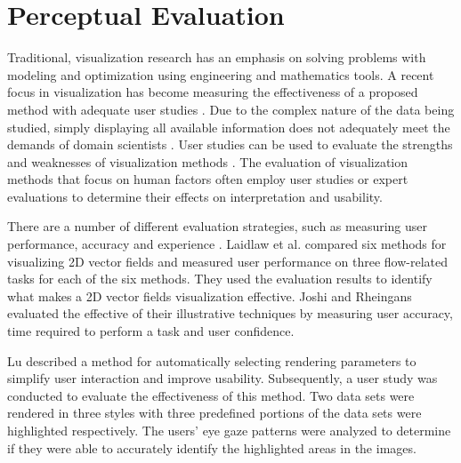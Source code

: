 


\section{Perceptual Evaluation}
Traditional, visualization research has an emphasis on solving problems with modeling and optimization using engineering and mathematics tools.
A recent focus in visualization has become measuring the effectiveness of a proposed method with adequate user studies \cite{giesen_conjoint_2007}.
Due to the complex nature of the data being studied, simply displaying all available information does not adequately meet the demands of domain scientists \cite{anderson_evaluating_2012}.
User studies can be used to evaluate the strengths and weaknesses of visualization methods \cite{christopher_thoughts_2003}.
The evaluation of visualization methods that focus on human factors often employ user studies or expert evaluations to determine their effects on interpretation and usability.

There are a number of different evaluation strategies, such as measuring user performance, accuracy and experience \cite{redmond_influencing_2010}. Laidlaw et al. \cite{laidlaw_quantitative_2001} compared six methods for visualizing 2D vector fields and measured user performance on three flow-related tasks for each of the six methods. They used the evaluation results to identify what makes a 2D vector fields visualization effective.
Joshi and Rheingans \cite{joshi_evaluation_2008} evaluated the effective of their illustrative techniques by measuring user accuracy, time required to perform a task and user confidence.

Lu \cite{lu_volume_2010} described a method for automatically selecting rendering parameters to simplify user interaction and improve usability. Subsequently, a user study was conducted to evaluate the effectiveness of this method. Two data sets were rendered in three styles with three predefined portions of the data sets were highlighted respectively. The users' eye gaze patterns were analyzed to determine if they were able to accurately identify the highlighted areas in the images.

